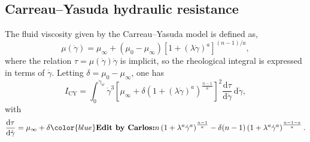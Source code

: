 \documentclass[lineno]{jfm}
\newcommand{\cbp}[1]{{\color{blue} \textbf{Edit by Carlos:} #1}}
\begin{document}
\subsection{Carreau--Yasuda hydraulic resistance}

The fluid viscosity given by the Carreau--Yasuda model is defined as,
\[
\mu(\dot{\gamma})
=
\mu_{\infty}
+
(\mu_0-\mu_{\infty})
\left[1+(\lambda\dot{\gamma})^a\right]^{(n-1)/a},
\]
where the relation $\tau=\mu(\dot{\gamma})\dot{\gamma}$ is implicit, so the rheological integral is expressed in terms of $\dot{\gamma}$. Letting $\delta=\mu_0-\mu_{\infty}$, one has
\begin{equation}
I_{\mathrm{CY}}
=
\int_{0}^{\dot{\gamma}_w}
\dot{\gamma}^3
\left[\mu_{\infty}+\delta\left(1+(\lambda\dot{\gamma})^a\right)^{\frac{n-1}{a}}\right]^2
\frac{\mathrm{d}\tau}{\mathrm{d}\dot{\gamma}}\,\mathrm{d}\dot{\gamma},
\label{eq:I_CY_start}
\end{equation}
with
\begin{equation}
\frac{\mathrm{d}\tau}{\mathrm{d}\dot{\gamma}}
=
\mu_{\infty}
+\delta \cbp{n} \left(1+\lambda^a\dot{\gamma}^a\right)^{\frac{n-1}{a}}
-\delta(n-1)\left(1+\lambda^a\dot{\gamma}^a\right)^{\frac{n-1-a}{a}}.
\label{eq:dtau_dgamma_CY}
\end{equation}

\end{document}
